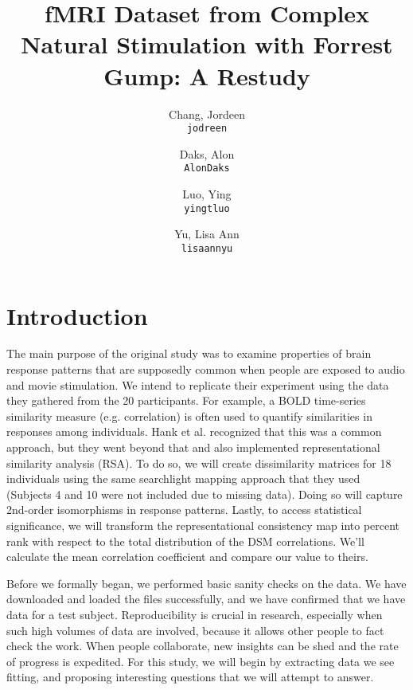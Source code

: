 \documentclass[11pt]{article}
\title{fMRI Dataset from Complex Natural Stimulation with Forrest Gump: A Restudy}
\author{
  Chang, Jordeen\\
  \texttt{jodreen}
  \and
  Daks, Alon\\
  \texttt{AlonDaks}
  \and
  Luo, Ying\\
  \texttt{yingtluo}
  \and
  Yu, Lisa Ann\\
  \texttt{lisaannyu}
}
\begin{document}
\maketitle


\section{Introduction}

The main purpose of the original study was to examine properties of brain
response patterns that are supposedly common when people are exposed to audio
and movie stimulation. We intend to replicate their experiment using the data
they gathered from the 20 participants. For example, a BOLD time-series
similarity measure (e.g. correlation) is often used to quantify similarities
in responses among individuals. Hank et al. recognized that this was a common
approach, but they went beyond that and also implemented representational
similarity analysis (RSA). To do so, we will create dissimilarity matrices for
18 individuals using the same searchlight mapping approach that they used
(Subjects 4 and 10 were not included due to missing data). Doing so will
capture 2nd-order isomorphisms in response patterns. Lastly, to access
statistical significance, we will transform the representational consistency
map into percent rank with respect to the total distribution of the DSM
correlations. We'll calculate the mean correlation coefficient and compare our
value to theirs.

Before we formally began, we performed basic sanity checks on the data. We
have downloaded and loaded the files successfully, and we have confirmed that
we have data for a test subject. Reproducibility is crucial in research,
especially when such high volumes of data are involved, because it allows
other people to fact check the work. When people collaborate, new insights can
be shed and the rate of progress is expedited. For this study, we will begin
by extracting data we see fitting, and proposing interesting questions that we
will attempt to answer.
\end{document}
